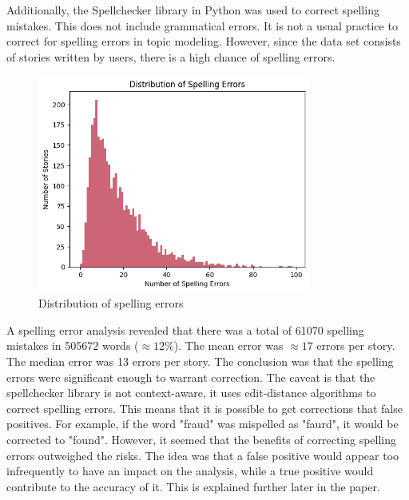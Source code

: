 Additionally, the Spellchecker library in Python was used to correct spelling mistakes. This does not include grammatical errors. It is not a usual practice to correct for spelling errors in topic modeling. However, since the data set consists of stories written by users, there is a high chance of spelling errors. 

\begin{figure}[h]
    \centering
    \includegraphics[width=0.8\textwidth]{resources/spelling_mistakes_distribution.png}
    \caption{Distribution of spelling errors}
    \label{fig:spelling_error_distribution}
\end{figure}


A spelling error analysis revealed that there was a total of 61070 spelling mistakes in 505672 words ($\approx 12\%$). The mean error was $\approx17$ errors per story. The median error was 13 errors per story. The conclusion was that the spelling errors were significant enough to warrant correction. The caveat is that the spellchecker library is not context-aware, it uses edit-distance algorithms to correct spelling errors. This means that it is possible to get corrections that false positives. For example, if the word "fraud" was mispelled as "faurd", it would be corrected to "found". However, it seemed that the benefits of correcting spelling errors outweighed the risks. The idea was that a false positive would appear too infrequently to have an impact on the analysis, while a true positive would contribute to the accuracy of it. This is explained further later in the paper.